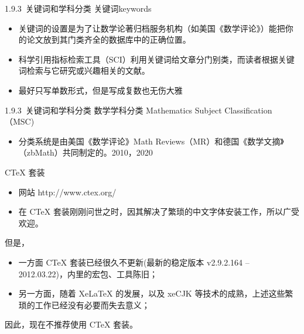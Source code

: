 \documentclass[13pt,fontset=mac]{ctexbeamer}
\begin{document}
\begin{frame}{1.9.3~关键词和学科分类}
	关键词keywords
	\begin{itemize}
		
		\item 关键词的设置是为了让数学论著归档服务机构（如美国《数学评论》）能把你的论文放到其门类齐全的数据库中的正确位置。
		
		\item 科学引用指标检索工具（SCI）利用关键词给文章分门别类，而读者根据关键词检索与它研究或兴趣相关的文献。
		\item 最好只写单数形式，但是写成复数也无伤大雅
			\end{itemize}
\end{frame}


\begin{frame}{1.9.3~关键词和学科分类}
数学学科分类 Mathematics Subject Classification  （MSC)
	\begin{itemize}
		
		\item 分类系统是由美国《数学评论》Math Reviews（MR）和德国《数学文摘》（zbMath）共同制定的。2010，2020
		
	\end{itemize}
\end{frame}



\begin{frame}
{CTeX 套装}


\begin{itemize}
	\item 网站  http://www.ctex.org/
	\item 在 CTeX 套装刚刚问世之时，因其解决了繁琐的中文字体安装工作，所以广受欢迎。
\end{itemize}
 但是，
\begin{itemize}
	\item  一方面 CTeX 套装已经很久不更新(最新的稳定版本	v2.9.2.164 -- 2012.03.22)，内里的宏包、工具陈旧；
	\item 另一方面，随着 XeLaTeX 的发展，以及 xeCJK 等技术的成熟，上述这些繁琐的工作已经没有必要而失去意义；
\end{itemize}

	因此，\alert{现在不推荐使用 CTeX 套装}。
	


\end{frame}
\end{document}
